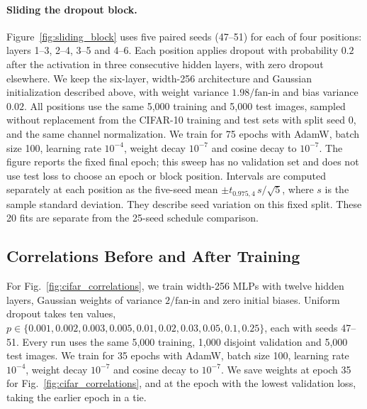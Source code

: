 \paragraph{Sliding the dropout block.}
Figure~\ref{fig:sliding_block} uses five paired seeds (47--51) for each of four positions: layers 1--3, 2--4, 3--5 and 4--6. Each position applies dropout with probability $0.2$ after the \relu{} activation in three consecutive hidden layers, with zero dropout elsewhere. We keep the six-layer, width-256 architecture and Gaussian initialization described above, with weight variance $1.98/\mathrm{fan\mbox{-}in}$ and bias variance $0.02$. All positions use the same 5,000 training and 5,000 test images, sampled without replacement from the CIFAR-10 training and test sets with split seed 0, and the same channel normalization. We train for 75 epochs with AdamW, batch size 100, learning rate $10^{-4}$, weight decay $10^{-7}$ and cosine decay to $10^{-7}$. The figure reports the fixed final epoch; this sweep has no validation set and does not use test loss to choose an epoch or block position. Intervals are computed separately at each position as the five-seed mean $\pm t_{0.975,4}\,s/\sqrt{5}$, where $s$ is the sample standard deviation. They describe seed variation on this fixed split. These 20 fits are separate from the 25-seed schedule comparison.

\subsection{Correlations Before and After Training}
\label{app:cifar_correlations}
For Fig.~\ref{fig:cifar_correlations}, we train width-256 MLPs with twelve hidden \relu{} layers, Gaussian weights of variance $2/\mathrm{fan\mbox{-}in}$ and zero initial biases. Uniform dropout takes ten values, $p\in\{0.001,0.002,0.003,0.005,0.01,0.02,0.03,0.05,0.1,0.25\}$, each with seeds 47--51. Every run uses the same 5,000 training, 1,000 disjoint validation and 5,000 test images. We train for 35 epochs with AdamW, batch size 100, learning rate $10^{-4}$, weight decay $10^{-7}$ and cosine decay to $10^{-7}$. We save weights at epoch 35 for Fig.~\ref{fig:cifar_correlations}, and at the epoch with the lowest validation loss, taking the earlier epoch in a tie.

